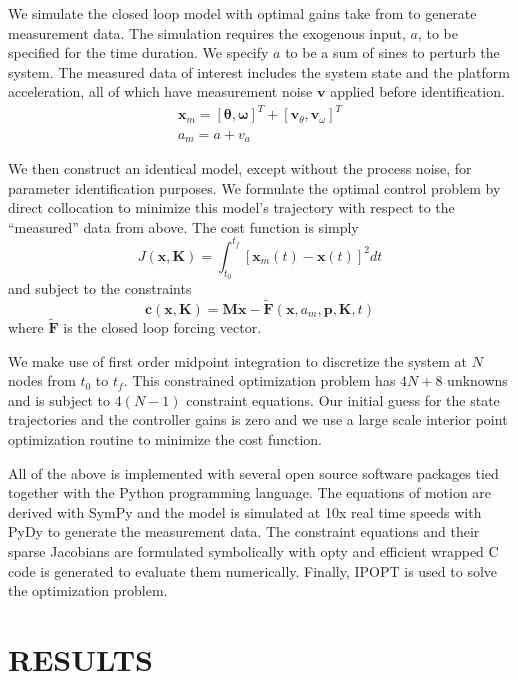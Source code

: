 \documentclass[11pt,a4paper,twocolumn]{article}
\newcommand*{\ElevenPtFont}{%
      \fontsize{11}{20}%
      \selectfont}
\begin{document}
We simulate the closed loop model with optimal gains take from \cite{Park2004}
to generate measurement data. The simulation requires the exogenous input, $a$,
to be specified for the time duration. We specify $a$ to be a sum of sines to
perturb the system. The measured data of interest includes the system state and
the platform acceleration, all of which have measurement noise $\mathbf{v}$
applied before identification.
%
\begin{align}
  \mathbf{x}_m = [\mathbf{\theta}, \mathbf{\omega}]^T + [\mathbf{v}_\theta,
  \mathbf{v}_\omega]^T \\
  a_m = a + v_a
\end{align}

We then construct an identical model, except without the process noise, for
parameter identification purposes. We formulate the optimal control problem by
direct collocation to minimize this model's trajectory with respect to the
``measured'' data from above. The cost function is simply
%
\begin{equation}
  J(\mathbf{x}, \mathbf{K}) = \int_{t_0}^{t_f}[\mathbf{x}_m(t) - \mathbf{x}(t)]^2 dt
\end{equation}
%
and subject to the constraints
%
\begin{equation}
  \mathbf{c}(\mathbf{x}, \mathbf{K}) = \mathbf{M} \dot{\mathbf{x}} -
  \tilde{\mathbf{F}}(\mathbf{x},
  a_m, \mathbf{p}, \mathbf{K}, t)
\end{equation}
%
where $\tilde{\mathbf{F}}$ is the closed loop forcing vector.

We make use of first order midpoint integration to discretize the system at $N$
nodes from $t_0$ to $t_f$. This constrained optimization problem has $4N + 8$
unknowns and is subject to $4(N-1)$ constraint equations. Our initial guess for
the state trajectories and the controller gains is zero and we use a large
scale interior point optimization routine to minimize the cost function.

All of the above is implemented with several open source software packages tied
together with the Python programming language. The equations of motion are
derived with SymPy and the model is simulated at 10x real time speeds with PyDy
to generate the measurement data. The constraint equations and their sparse
Jacobians are formulated symbolically with opty and efficient wrapped C code is
generated to evaluate them numerically. Finally, IPOPT is used to solve the
optimization problem.

\section*{\ElevenPtFont RESULTS}
\end{document}
